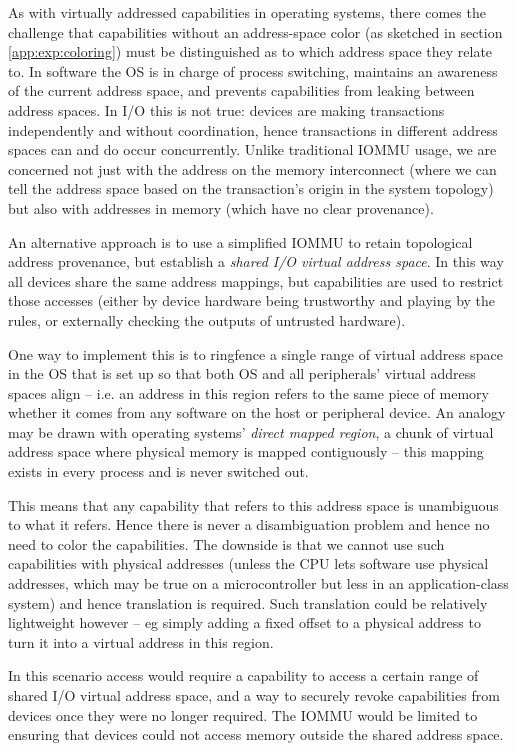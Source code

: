 As with virtually addressed capabilities in operating systems, there comes
the challenge that capabilities without an address-space color (as sketched in
section \ref{app:exp:coloring}) must be distinguished as to which
address space they relate to.  In software the OS is in charge of process
switching, maintains an awareness of the current address space, and prevents
capabilities from leaking between address spaces.  In I/O this is not true:
devices are making transactions independently and without coordination,
hence transactions in different address spaces can and do occur
concurrently.  Unlike traditional IOMMU usage, we are concerned not
just with the address on the memory interconnect (where we can tell the address
space based on the transaction's origin in the system topology) but also
with addresses in memory (which have no clear provenance).

An alternative approach is to use a simplified IOMMU to retain
topological address provenance, but establish a \emph{shared I/O virtual
address space}.
In this way all devices share the same address mappings, but
capabilities are used to restrict those accesses (either by device hardware
being trustworthy and playing by the rules, or externally checking the outputs
of untrusted hardware).

One way to implement this is to ringfence a single range of virtual address
space
in the OS that is set up so that both OS and all peripherals' virtual address
spaces align -- i.e.  an address in this region refers to the same piece of
memory whether it comes from any software on the host or peripheral device.
An analogy may be drawn with operating systems' \emph{direct mapped region},
a chunk of virtual address space where physical memory is mapped contiguously
-- this mapping exists in every process and is never switched out.

This means that any capability that refers to this address space is
unambiguous to what it refers.  Hence there is never a disambiguation
problem and hence no need to color the capabilities.  The downside is that
we cannot use such capabilities with physical addresses (unless the CPU lets
software use physical addresses, which may be true on a microcontroller but
less in an application-class system) and hence translation is required.
Such translation could be relatively lightweight however -- eg simply
adding a fixed offset to a physical address to turn it into a virtual
address in this region.

In this scenario access would require a capability to access a certain range of
shared I/O virtual address space, and a way to securely revoke capabilities
from devices once they were no longer required.  The IOMMU would be limited to
ensuring that devices could not access memory outside the shared address space.

